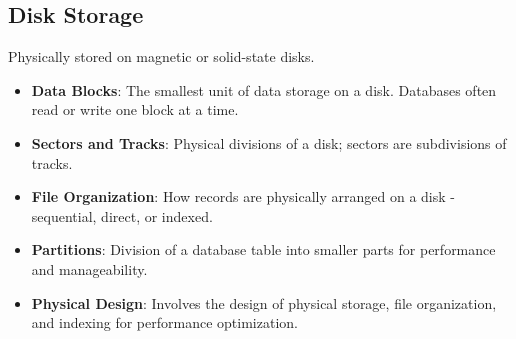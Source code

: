 \vspace{-0.1cm}
\subsection*{Disk Storage}
\vspace{-0.1cm}

\noindent
Physically stored on magnetic or solid-state disks.

\begin{itemize}[noitemsep,leftmargin=*]
\leftskip-\dimexpr\leftmargin %
\item[]{\textbf{Data Blocks}: The smallest unit of data storage on a disk. Databases often read or write one block at a time.}
\item[]{\textbf{Sectors and Tracks}: Physical divisions of a disk; sectors are subdivisions of tracks.}
\item[]{\textbf{File Organization}: How records are physically arranged on a disk - sequential, direct, or indexed.}
\item[]{\textbf{Partitions}: Division of a database table into smaller parts for performance and manageability.}
\item[]{\textbf{Physical Design}: Involves the design of physical storage, file organization, and indexing for performance optimization.}
\end{itemize}

